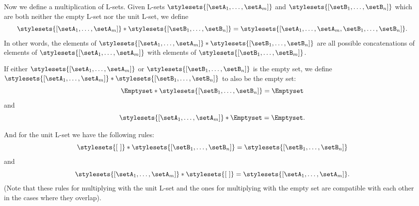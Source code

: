 Now we define a multiplication of L-sets.
Given L-sets $\stylesets{[\setA_1, \dots, \setA_m]}$ and $\stylesets{[\setB_1,  \dots, \setB_n]}$ which are both neither the empty L-set nor the unit L-set, we define
\begin{equation}
    \stylesets{[\setA_1, \dots, \setA_m]} * \stylesets{[\setB_1, \dots, \setB_n]} = \stylesets{[\setA_1, \dots, \setA_m, \setB_1,  \dots, \setB_n]}.
\end{equation}
In other words, the elements of $\stylesets{[\setA_1, \dots, \setA_m]} * \stylesets{[\setB_1, \dots, \setB_n]}$ are all possible concatenations of elements of $\stylesets{[\setA_1, \dots, \setA_m]}$ with elements of $\stylesets{[\setB_1, \dots, \setB_m]}$.

If either $\stylesets{[\setA_1, \dots, \setA_m]}$ or $\stylesets{[\setB_1, \dots, \setB_n]}$ is the empty set, we define $\stylesets{[\setA_1, \dots, \setA_m]} * \stylesets{[\setB_1, \dots, \setB_n]}$ to also be the empty set:
\begin{equation}
    \Emptyset * \stylesets{[\setB_1, \dots, \setB_n]} = \Emptyset
\end{equation}
and
\begin{equation}
    \stylesets{[\setA_1, \dots, \setA_m]} * \Emptyset = \Emptyset.
\end{equation}

And for the unit L-set we have the following rules:
\begin{equation}
    \stylesets{[ \ ]} * \stylesets{[\setB_1, \dots, \setB_n]} = \stylesets{[\setB_1,  \dots, \setB_n]}
\end{equation}
and
\begin{equation}
    \stylesets{[\setA_1, \dots, \setA_m]} * \stylesets{[ \ ]} = \stylesets{[\setA_1, \dots, \setA_m]}.
\end{equation}
(Note that these rules for multiplying with the unit L-set and the ones for multiplying with the empty set are compatible with each other in the cases where they overlap).

